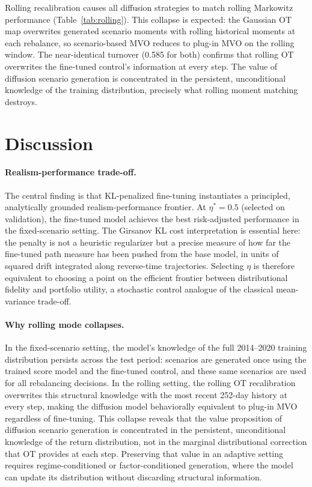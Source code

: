 \documentclass{article}
\begin{document}
Rolling recalibration causes all diffusion strategies to match rolling Markowitz
performance (Table~\ref{tab:rolling}). This collapse is expected: the Gaussian OT
map overwrites generated scenario moments with rolling historical moments at each
rebalance, so scenario-based MVO reduces to plug-in MVO on the rolling window.
The near-identical turnover (0.585 for both) confirms that rolling OT overwrites
the fine-tuned control's information at every step. The value of diffusion scenario
generation is concentrated in the persistent, unconditional knowledge of the
training distribution, precisely what rolling moment matching destroys.

\section{Discussion}
\label{sec:discussion}

\paragraph{Realism-performance trade-off.}
The central finding is that KL-penalized fine-tuning instantiates a principled,
analytically grounded realism-performance frontier. At $\eta^*=0.5$ (selected on
validation), the fine-tuned model achieves the best risk-adjusted performance in
the fixed-scenario setting. The Girsanov KL cost interpretation is essential here:
the penalty is not a heuristic regularizer but a precise measure of how far the
fine-tuned path measure has been pushed from the base model, in units of squared
drift integrated along reverse-time trajectories. Selecting $\eta$ is therefore
equivalent to choosing a point on the efficient frontier between distributional
fidelity and portfolio utility, a stochastic control analogue of the classical
mean-variance trade-off.

\paragraph{Why rolling mode collapses.}
In the fixed-scenario setting, the model's knowledge of the full 2014--2020
training distribution persists across the test period: scenarios are generated once
using the trained score model and the fine-tuned control, and these same scenarios
are used for all rebalancing decisions. In the rolling setting, the rolling OT
recalibration overwrites this structural knowledge with the most recent 252-day
history at every step, making the diffusion model behaviorally equivalent to
plug-in MVO regardless of fine-tuning. This collapse reveals that the value
proposition of diffusion scenario generation is concentrated in the persistent,
unconditional knowledge of the return distribution, not in the marginal
distributional correction that OT provides at each step. Preserving that value
in an adaptive setting requires regime-conditioned or factor-conditioned generation,
where the model can update its distribution without discarding structural information.
\end{document}
